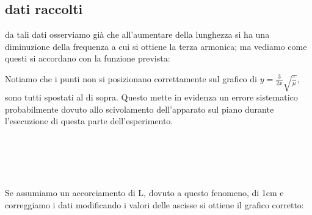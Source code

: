 \documentclass[a4paper]{article}
\theoremstyle{definition}
\begin{document}
\subsection{dati raccolti}


\begin{figure}[!ht]
\end{figure}
\noindent da tali dati osserviamo già che all'aumentare della lunghezza si ha una diminuzione della frequenza a cui si ottiene la terza armonica; ma vediamo come questi si accordano con la funzione prevista:


\begin{figure}[!ht]
\end{figure}
\noindent Notiamo che i punti non si posizionano correttamente sul grafico di \(y = \frac{3}{2x}\sqrt{\frac{\tau}{\mu}}\), sono tutti spostati al di sopra. Questo mette in evidenza un errore sistematico probabilmente dovuto allo scivolamento dell'apparato sul piano durante l'esecuzione di questa parte dell'esperimento.\\\\\\\\\\\\
Se assumiamo un accorciamento di L, dovuto a questo fenomeno, di 1cm e correggiamo i dati modificando i valori delle ascisse si ottiene il grafico corretto:
\end{document}
